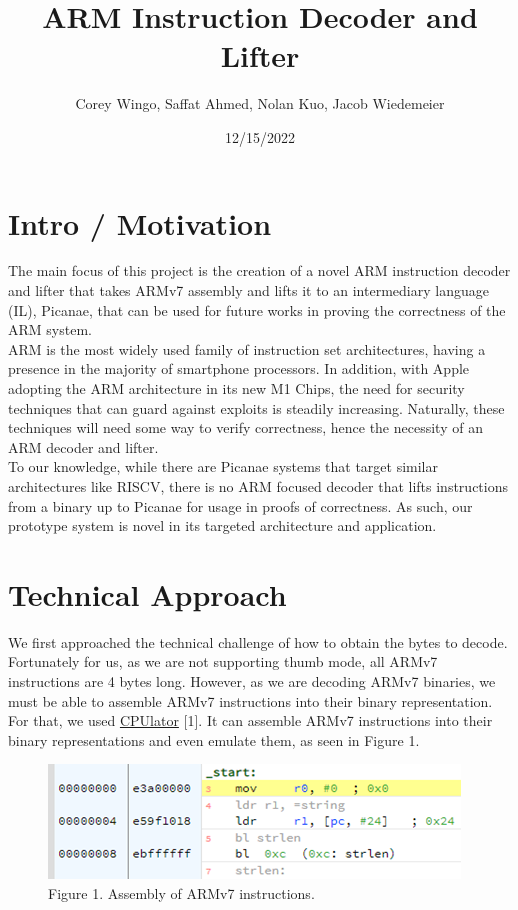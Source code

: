 \documentclass{article}
\title{ARM Instruction Decoder and Lifter}
\author{Corey Wingo, Saffat Ahmed, Nolan Kuo, Jacob Wiedemeier}
\date{12/15/2022}
\begin{document}
\maketitle
\begin{multicols}{2}

\section*{\centering Intro / Motivation}
\vspace{0.3cm}
The main focus of this project is the creation of a novel ARM instruction decoder and lifter that takes ARMv7 assembly and lifts it to an intermediary language (IL), Picanae, that can be used for future works in proving the correctness of the ARM system.\\

ARM is the most widely used family of instruction set architectures, having a presence in the majority of smartphone processors. In addition, with Apple adopting the ARM architecture in its new M1 Chips, the need for security techniques that can guard against exploits is steadily increasing. Naturally, these techniques will need some way to verify correctness, hence the necessity of an ARM decoder and lifter.\\

To our knowledge, while there are Picanae systems that target similar architectures like RISCV, there is no ARM focused decoder that lifts instructions from a binary up to Picanae for usage in proofs of correctness. As such, our prototype system is novel in its targeted architecture and application. 

\section*{\centering Technical Approach}
\vspace{0.3cm}
We first approached the technical challenge of how to obtain the bytes to decode. Fortunately for us, as we are not supporting thumb mode, all ARMv7 instructions are 4 bytes long. However, as we are decoding ARMv7 binaries, we must be able to assemble ARMv7 instructions into their binary representation. For that, we used \href{https://cpulator.01xz.net/?sys=arm}{CPUlator} [1]. It can assemble ARMv7 instructions into their binary representations and even emulate them, as seen in Figure 1.\\

\begin{figure}[H]
\includegraphics[width=\linewidth]{cpulator_example.png}\\
Figure 1. Assembly of ARMv7 instructions.
\centering
\end{figure}


\end{multicols}
\end{document}
